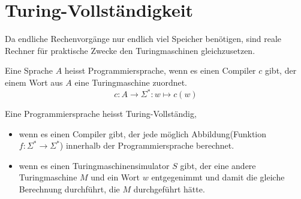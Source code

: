 \documentclass[a4paper]{article}
\begin{document}
\section{Turing-Vollständigkeit}
	\begin{multicols}{2}
	\begin{fmerke}[Realvergleich]
	Da endliche Rechenvorgänge nur endlich viel Speicher benötigen, sind reale Rechner für praktische Zwecke den Turingmaschinen gleichzusetzen.
	\end{fmerke}

	\begin{fdef}[Programmiersprache]
	Eine Sprache $A$ heisst Programmiersprache, wenn es einen Compiler $c$ gibt, der einem Wort aus $A$ eine Turingmaschine zuordnet.
	$$c: A \rightarrow \Sigma^*: w \mapsto c(w)$$
	\end{fdef}
	\end{multicols}

	\begin{fsatz}
	Eine Programmiersprache heisst Turing-Vollständig, 
	\begin{itemize}
		\item wenn es einen Compiler gibt, der jede möglich Abbildung(Funktion $f: \Sigma^* \rightarrow \Sigma^*$) innerhalb der Programmiersprache berechnet.
		\item wenn es einen Turingmaschinensimulator $S$ gibt, der eine andere Turingmaschine $M$ und ein Wort $w$ entgegenimmt und damit die gleiche Berechnung durchführt, die $M$ durchgeführt hätte.
	\end{itemize} 
	\end{fsatz}
	
\end{document}
